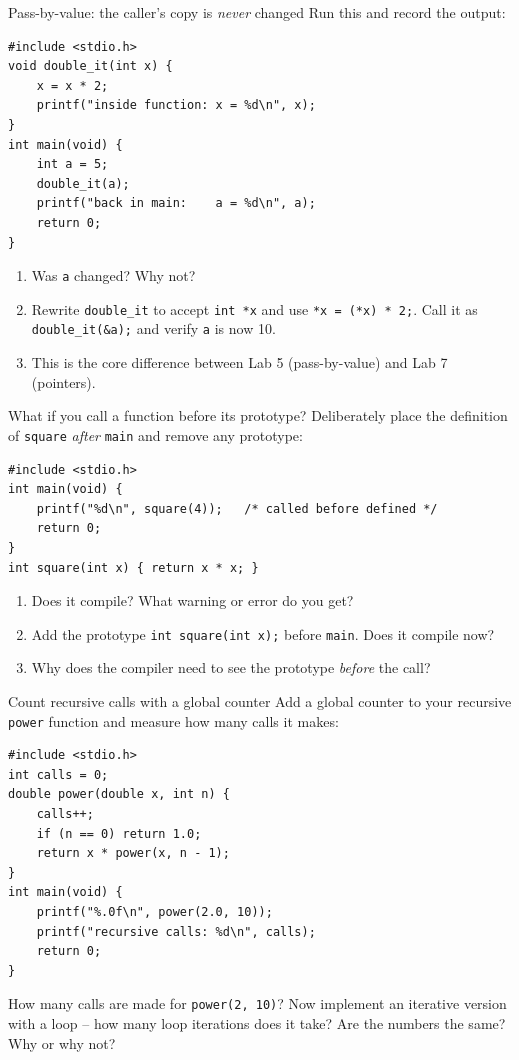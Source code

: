 \documentclass[11pt]{article}
\begin{document}
\begin{tryit}{Pass-by-value: the caller's copy is \emph{never} changed}
Run this and record the output:
\begin{lstlisting}
#include <stdio.h>
void double_it(int x) {
    x = x * 2;
    printf("inside function: x = %d\n", x);
}
int main(void) {
    int a = 5;
    double_it(a);
    printf("back in main:    a = %d\n", a);
    return 0;
}
\end{lstlisting}
\begin{enumerate}[nosep,leftmargin=*]
  \item Was \texttt{a} changed? Why not?
  \item Rewrite \texttt{double\_it} to accept \texttt{int *x} and use \texttt{*x = (*x) * 2;}.
        Call it as \texttt{double\_it(\&a);} and verify \texttt{a} is now 10.
  \item This is the core difference between Lab 5 (pass-by-value) and Lab 7 (pointers).
\end{enumerate}
\end{tryit}

\begin{tryit}{What if you call a function before its prototype?}
Deliberately place the definition of \texttt{square} \emph{after} \texttt{main} and remove
any prototype:
\begin{lstlisting}
#include <stdio.h>
int main(void) {
    printf("%d\n", square(4));   /* called before defined */
    return 0;
}
int square(int x) { return x * x; }
\end{lstlisting}
\begin{enumerate}[nosep,leftmargin=*]
  \item Does it compile? What warning or error do you get?
  \item Add the prototype \texttt{int square(int x);} before \texttt{main}. Does it compile now?
  \item Why does the compiler need to see the prototype \emph{before} the call?
\end{enumerate}
\end{tryit}

\begin{tryit}{Count recursive calls with a global counter}
Add a global counter to your recursive \texttt{power} function and measure how many calls it makes:
\begin{lstlisting}
#include <stdio.h>
int calls = 0;
double power(double x, int n) {
    calls++;
    if (n == 0) return 1.0;
    return x * power(x, n - 1);
}
int main(void) {
    printf("%.0f\n", power(2.0, 10));
    printf("recursive calls: %d\n", calls);
    return 0;
}
\end{lstlisting}
How many calls are made for \texttt{power(2, 10)}?
Now implement an iterative version with a loop -- how many loop iterations does it take?
Are the numbers the same? Why or why not?
\end{tryit}
\end{document}
